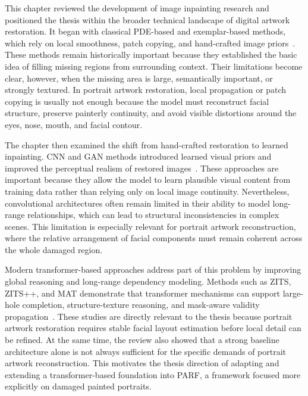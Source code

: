 \documentclass[12pt, twoside]{report}
\begin{document}
This chapter reviewed the development of image inpainting research and positioned the thesis within the broader technical landscape of digital artwork restoration. It began with classical PDE-based and exemplar-based methods, which rely on local smoothness, patch copying, and hand-crafted image priors~\cite{bertalmio2000inpainting,criminisi2004exemplar,barnes2009patchmatch}. These methods remain historically important because they established the basic idea of filling missing regions from surrounding context. Their limitations become clear, however, when the missing area is large, semantically important, or strongly textured. In portrait artwork restoration, local propagation or patch copying is usually not enough because the model must reconstruct facial structure, preserve painterly continuity, and avoid visible distortions around the eyes, nose, mouth, and facial contour.

The chapter then examined the shift from hand-crafted restoration to learned inpainting. CNN and GAN methods introduced learned visual priors and improved the perceptual realism of restored images~\cite{pathak2016context,iizuka2017global}. These approaches are important because they allow the model to learn plausible visual content from training data rather than relying only on local image continuity. Nevertheless, convolutional architectures often remain limited in their ability to model long-range relationships, which can lead to structural inconsistencies in complex scenes. This limitation is especially relevant for portrait artwork reconstruction, where the relative arrangement of facial components must remain coherent across the whole damaged region.

Modern transformer-based approaches address part of this problem by improving global reasoning and long-range dependency modeling. Methods such as ZITS, ZITS++, and MAT demonstrate that transformer mechanisms can support large-hole completion, structure-texture reasoning, and mask-aware validity propagation~\cite{zeng2022zits,zeng2023zitspp,li2022mat}. These studies are directly relevant to the thesis because portrait artwork restoration requires stable facial layout estimation before local detail can be refined. At the same time, the review also showed that a strong baseline architecture alone is not always sufficient for the specific demands of portrait artwork reconstruction. This motivates the thesis direction of adapting and extending a transformer-based foundation into PARF, a framework focused more explicitly on damaged painted portraits.
\end{document}
